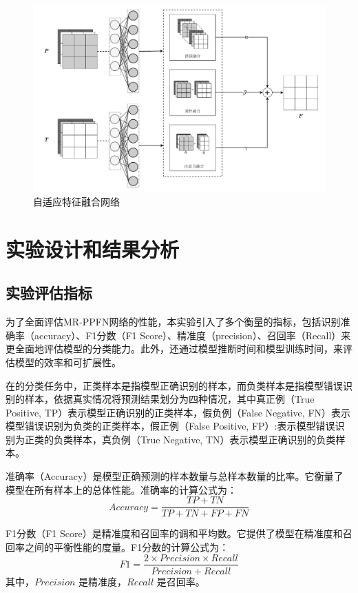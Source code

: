 \begin{figure}[htbp] 
    \centering
    \includegraphics[width=0.8\linewidth]{imgs/Adaptive Fusion NetWork.pdf}
    \caption{自适应特征融合网络}
    \label{fig:Adaptive Fusion NetWork}
\end{figure}

\section{实验设计和结果分析}
\subsection{实验评估指标}
为了全面评估MR-PPFN网络的性能，本实验引入了多个衡量的指标，包括识别准确率（accuracy）、F1分数（F1 Score）、精准度（precision）、召回率（Recall）来更全面地评估模型的分类能力。此外，还通过模型推断时间和模型训练时间，来评估模型的效率和可扩展性。
 
在的分类任务中，正类样本是指模型正确识别的样本，而负类样本是指模型错误识别的样本，依据真实情况将预测结果划分为四种情况，其中真正例（True Positive, TP）表示模型正确识别的正类样本，假负例（False Negative, FN）表示模型错误识别为负类的正类样本，假正例（False Positive, FP）:表示模型错误识别为正类的负类样本，真负例（True Negative, TN）表示模型正确识别的负类样本。

准确率（Accuracy）是模型正确预测的样本数量与总样本数量的比率。它衡量了模型在所有样本上的总体性能。准确率的计算公式为：
\begin{equation}
    \label{eq:accuracy}
    Accuracy = \frac{TP + TN}{TP + TN + FP + FN}
\end{equation}

F1分数（F1 Score）是精准度和召回率的调和平均数。它提供了模型在精准度和召回率之间的平衡性能的度量。F1分数的计算公式为：
\begin{equation}
    \label{eq:f1}
    F1 = \frac{2 \times Precision \times Recall}{Precision + Recall}
\end{equation}
其中，$Precision$ 是精准度，$Recall$ 是召回率。

